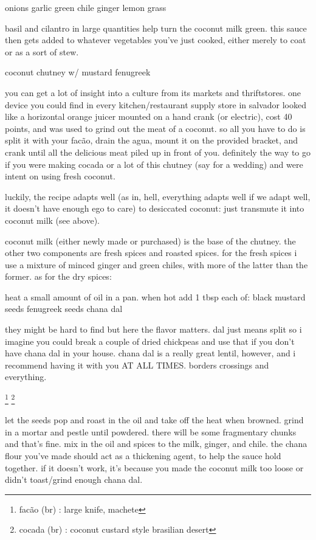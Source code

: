 	onions
	garlic
	green chile
	ginger
	lemon grass

basil and cilantro in large quantities help turn the coconut milk green. this sauce then gets added to whatever vegetables you've just cooked, either merely to coat or as a sort of stew.

coconut chutney w/ mustard fenugreek

you can get a lot of insight into a culture from its markets and thriftstores. one device you could find in every kitchen/restaurant supply store in salvador looked like a horizontal orange juicer mounted on a hand crank (or electric), cost 40 points, and was used to grind out the meat of a coconut. so all you have to do is split it with your fac\~{a}o, drain the agua, mount it on the provided bracket, and crank until all the delicious meat piled up in front of you. definitely the way to go if you were making cocada or a lot of this chutney (say for a wedding) and were intent on using fresh coconut.

luckily, the recipe adapts well (as in, hell, everything adapts well if we adapt well, it doesn't have enough ego to care) to desiccated coconut: just transmute it into coconut milk (see above).

coconut milk (either newly made or purchased) is the base of the chutney. the other two components are fresh spices and roasted spices. for the fresh spices i use a mixture of minced ginger and green chiles, with more of the latter than the former. as for the dry spices:

heat a small amount of oil in a pan. when hot add 1 tbsp each of:
	black mustard seeds
	fenugreek seeds
	chana dal

they might be hard to find but here the flavor matters. dal just means split so i imagine you could break a couple of dried chickpeas and use that if you don't have chana dal in your house. chana dal is a really great lentil, however, and i recommend having it with you AT ALL TIMES. borders crossings and everything.

\footnote{fac\~{a}o (br) : large knife, machete}
\footnote{cocada (br) : coconut custard style brasilian desert}

let the seeds pop and roast in the oil and take off the heat when browned. grind in a mortar and pestle until powdered. there will be some fragmentary chunks and that's fine. mix in the oil and spices to the milk, ginger, and chile. the chana flour you've made should act as a thickening agent, to help the sauce hold together. if it doesn't work, it's because you made the coconut milk too loose or didn't toast/grind enough chana dal.

